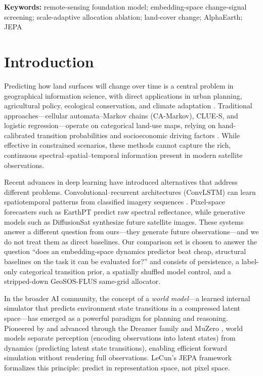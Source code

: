 \documentclass{article}
\newenvironment{keywords}{\par\noindent\textbf{Keywords:} }{\par}%
\begin{document}
\begin{keywords}
remote-sensing foundation model; embedding-space change-signal screening; scale-adaptive allocation ablation; land-cover change; AlphaEarth; JEPA
\end{keywords}

\section{Introduction}
\label{sec:intro}

Predicting how land surfaces will change over time is a central problem in geographical information science, with direct applications in urban planning, agricultural policy, ecological conservation, and climate adaptation \citep{verburg2004lulc}. Traditional approaches---cellular automata--Markov chains (CA-Markov), CLUE-S, and logistic regression---operate on categorical land-use maps, relying on hand-calibrated transition probabilities and socioeconomic driving factors \citep{veldkamp2004clues}. While effective in constrained scenarios, these methods cannot capture the rich, continuous spectral--spatial--temporal information present in modern satellite observations.

Recent advances in deep learning have introduced alternatives that address different problems. Convolutional--recurrent architectures (ConvLSTM) can learn spatiotemporal patterns from classified imagery sequences \citep{shi2015convlstm}. Pixel-space forecasters such as EarthPT \citep{smith2023earthpt} predict raw spectral reflectance, while generative models such as DiffusionSat \citep{khanna2023diffusionsat} synthesize future satellite images. These systems answer a different question from ours---they generate future observations---and we do not treat them as direct baselines. Our comparison set is chosen to answer the question ``does an embedding-space dynamics predictor beat cheap, structural baselines on the task it can be evaluated for?'' and consists of persistence, a label-only categorical transition prior, a spatially shuffled model control, and a stripped-down GeoSOS-FLUS same-grid allocator.

In the broader AI community, the concept of a \textit{world model}---a learned internal simulator that predicts environment state transitions in a compressed latent space---has emerged as a powerful paradigm for planning and reasoning. Pioneered by \citet{ha2018world} and advanced through the Dreamer family \citep{hafner2023dreamerv3} and MuZero \citep{schrittwieser2020muzero}, world models separate perception (encoding observations into latent states) from dynamics (predicting latent state transitions), enabling efficient forward simulation without rendering full observations. LeCun's JEPA framework \citep{lecun2022jepa} formalizes this principle: predict in representation space, not pixel space.
\end{document}

